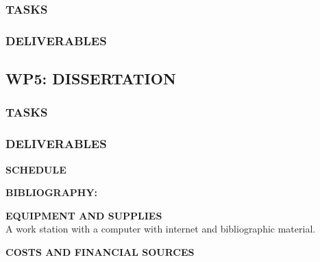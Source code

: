 \documentclass[letterpaper,12pt]{article}
\begin{document}
\subsubsection*{TASKS }
\begin{itemize}
\end{itemize}

\subsubsection*{DELIVERABLES }
\begin{itemize}
\end{itemize}

\subsection*{WP5: DISSERTATION}
\subsubsection*{TASKS}
\begin{itemize}
\end{itemize}
\subsubsection*{DELIVERABLES }
\begin{itemize}
\end{itemize}

\clearpage

 \item \textbf{SCHEDULE}\\


 \item \textbf{BIBLIOGRAPHY:}\\

\begin{thebibliography}{References}



\end{thebibliography}


 \item \textbf{EQUIPMENT AND SUPPLIES}\\
A work station with a computer with internet and bibliographic material.


 \item \textbf{COSTS AND FINANCIAL SOURCES}\\
\end{document}
